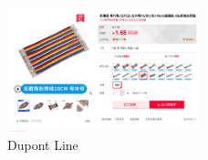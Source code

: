 \documentclass[a4paper,12pt]{article}
\begin{document}
\begin{appendices}
\begin{figure}[H] %
\centering %
\includegraphics[width=0.5\textwidth]{line.png} %
\caption{Dupont Line} %
\end{figure}













\end{appendices}
\end{document}

